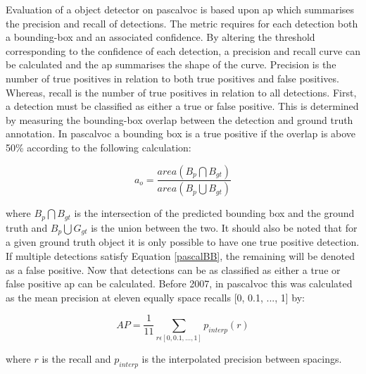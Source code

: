Evaluation of a object detector on \gls{pascalvoc} is based upon \gls{ap} which summarises the precision and recall of detections. The metric requires for each detection both a bounding-box and an associated confidence. By altering the threshold corresponding to the confidence of each detection, a precision and recall curve can be calculated and the \gls{ap} summarises the shape of the curve. Precision is the number of true positives in relation to both true positives and false positives. Whereas, recall is the number of true positives in relation to all detections. First, a detection must be classified as either a true or false positive. This is determined by measuring the bounding-box overlap between the detection and ground truth annotation. In \gls{pascalvoc} a bounding box is a true positive if the overlap is above 50\% according to the following calculation:

\begin{equation}\label{pascalBB}
	a_o = \frac{area(B_p \bigcap B_{gt})}{area(B_p \bigcup B_{gt})}
\end{equation}
 
where $B_p \bigcap B_{gt}$ is the intersection of the predicted bounding box and the ground truth and $B_p \bigcup G_{gt}$ is the union between the two. It should also be noted that for a given ground truth object it is only possible to have one true positive detection. If multiple detections satisfy Equation \ref{pascalBB}, the remaining will be denoted as a false positive. Now that detections can be as classified as either a true or false positive \gls{ap} can be calculated. Before 2007, in \gls{pascalvoc} this was calculated as the mean precision at eleven equally space recalls [0, 0.1, ..., 1] by:

\begin{equation}
	AP = \frac{1}{11} \sum_{r\epsilon[0, 0.1, ..., 1]}p_{interp}(r)  
\end{equation}

where $r$ is the recall and $p_{interp}$ is the interpolated precision between spacings.

